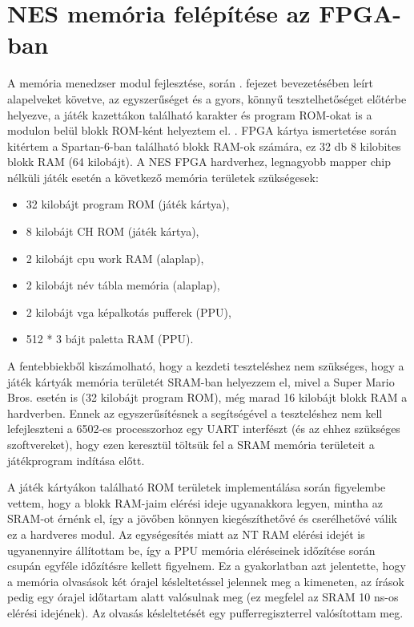 \section{NES memória felépítése az FPGA-ban}

A memória menedzser modul fejlesztése, során . fejezet bevezetésében leírt alapelveket követve, az egyszerűséget és a gyors, könnyű tesztelhetőséget előtérbe helyezve, a játék kazettákon található karakter és program ROM-okat is a modulon belül blokk ROM-ként helyeztem el. . FPGA kártya ismertetése során kitértem a Spartan-6-ban található blokk RAM-ok számára, ez 32 db 8 kilobites blokk RAM (64 kilobájt). A NES FPGA hardverhez, legnagyobb mapper chip nélküli játék esetén a következő memória területek szükségesek:

\begin{itemize}
	\item 32 kilobájt program ROM (játék kártya), 
	\item 8 kilobájt CH ROM (játék kártya),
	\item 2 kilobájt cpu work RAM (alaplap),
	\item 2 kilobájt név tábla memória (alaplap),
	\item 2 kilobájt vga képalkotás pufferek (PPU),
	\item 512 * 3 bájt paletta RAM (PPU).
\end{itemize}

A fentebbiekből kiszámolható, hogy a kezdeti teszteléshez nem szükséges, hogy a játék kártyák memória területét SRAM-ban helyezzem el, mivel a Super Mario Bros. esetén is (32 kilobájt program ROM), még marad 16 kilobájt blokk RAM a hardverben. Ennek az egyszerűsítésnek a segítségével a teszteléshez nem kell lefejleszteni a 6502-es processzorhoz egy UART interfészt (és az ehhez szükséges szoftvereket), hogy ezen keresztül töltsük fel a SRAM memória területeit a játékprogram indítása előtt. 

A játék kártyákon található ROM területek implementálása során figyelembe vettem, hogy a blokk RAM-jaim elérési ideje ugyanakkora legyen, mintha az SRAM-ot érnénk el, így a jövőben könnyen kiegészíthetővé és cserélhetővé válik ez a hardveres modul. Az egységesítés miatt az NT RAM elérési idejét is ugyanennyire állítottam be, így a PPU memória eléréseinek időzítése során csupán egyféle időzítésre kellett figyelnem. Ez a gyakorlatban azt jelentette, hogy a memória olvasások két órajel késleltetéssel jelennek meg a kimeneten, az írások pedig egy órajel időtartam alatt valósulnak meg (ez megfelel az SRAM 10 ns-os elérési idejének). Az olvasás késleltetését egy pufferregiszterrel valósítottam meg.

